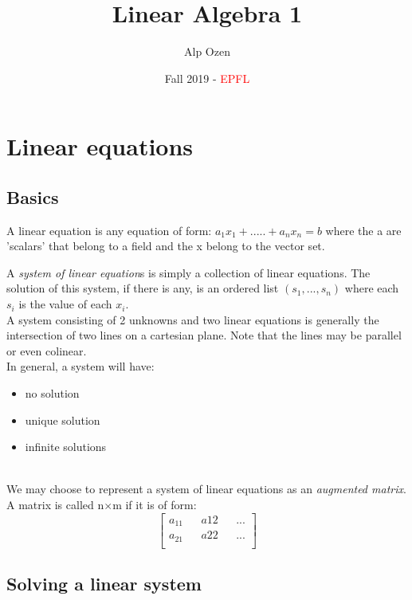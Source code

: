 \documentclass[titlepage]{article}
\title{\textbf{Linear Algebra 1}}
\author{Alp Ozen}
\date{Fall 2019 - \textcolor{red}{EPFL}}
\numberwithin{equation}{subsection}
\begin{document}
\maketitle
\tableofcontents

\clearpage

\section{Linear equations}
\subsection{Basics}

\begin{tcolorbox}
A linear equation is any equation of form:
$a_{1}x_{1}+ ..... + a_{n}x_{n} = b$
where the a are 'scalars' that belong to a field and the x belong to the vector set. 
\end{tcolorbox}

A \textit{system of linear equation}s is simply a collection of linear equations. The solution of this system, if there is any, is an ordered list $(s_{1},...,s_{n})$ where each $s_{i}$ is the value of each $x_{i}$.
\\

A system consisting of 2 unknowns and two linear equations is generally the intersection of two lines on a cartesian plane. Note that the lines may be parallel or even colinear. 
\\

In general, a system will have:
\begin{itemize}
    \item no solution
    \item unique solution
    \item infinite solutions 
\end{itemize}
\\

We may choose to represent a system of linear equations as an \textit{augmented matrix}. A matrix is called n$\times$m if it is of form:
\begin{equation*}
    \begin{bmatrix}
    a_{11} && a{12} &&  ... \\
    a_{21} && a {22}  && ... \\
    \end{bmatrix}
\end{equation*}

\subsection{Solving a linear system}
\end{document}
